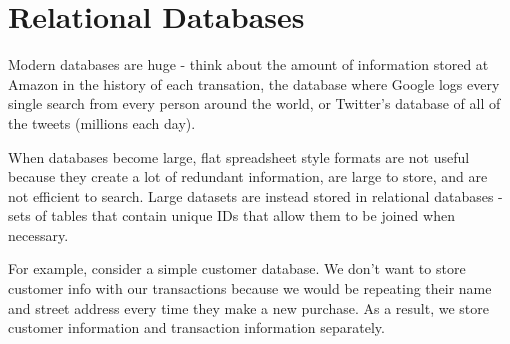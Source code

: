 \documentclass[]{book}
\theoremstyle{definition}
\theoremstyle{definition}
\theoremstyle{definition}
\theoremstyle{remark}
\begin{document}
\hypertarget{relational-databases}{%
\section{Relational Databases}\label{relational-databases}}

Modern databases are huge - think about the amount of information stored
at Amazon in the history of each transation, the database where Google
logs every single search from every person around the world, or
Twitter's database of all of the tweets (millions each day).

When databases become large, flat spreadsheet style formats are not
useful because they create a lot of redundant information, are large to
store, and are not efficient to search. Large datasets are instead
stored in relational databases - sets of tables that contain unique IDs
that allow them to be joined when necessary.

For example, consider a simple customer database. We don't want to store
customer info with our transactions because we would be repeating their
name and street address every time they make a new purchase. As a
result, we store customer information and transaction information
separately.
\end{document}
